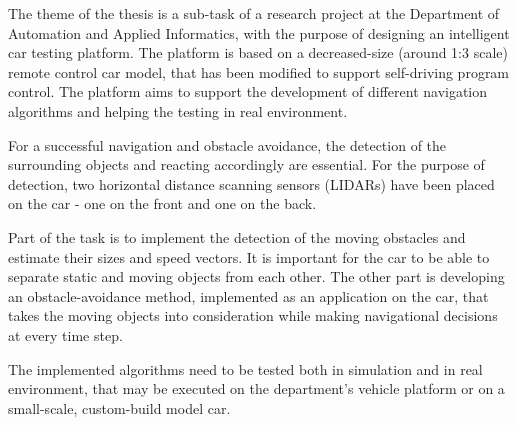 The theme of the thesis is a sub-task of a research project at the Department of Automation and Applied Informatics, with the purpose of designing an intelligent car testing platform. The platform is based on a decreased-size (around 1:3 scale) remote control car model, that has been modified to support self-driving program control. The platform aims to support the development of different navigation algorithms and helping the testing in real environment.

For a successful navigation and obstacle avoidance, the detection of the surrounding objects and reacting accordingly are essential. For the purpose of detection, two horizontal distance scanning sensors (LIDARs) have been placed on the car - one on the front and one on the back.

Part of the task is to implement the detection of the moving obstacles and estimate their sizes and speed vectors. It is important for the car to be able to separate static and moving objects from each other. The other part is developing an obstacle-avoidance method, implemented as an application on the car, that takes the moving objects into consideration while making navigational decisions at every time step.

The implemented algorithms need to be tested both in simulation and in real environment, that may be executed on  the department's vehicle platform or on a small-scale, custom-build model car.

\vfill
\selectthesislanguage

\setcounter{romanPage}{\value{page}}
